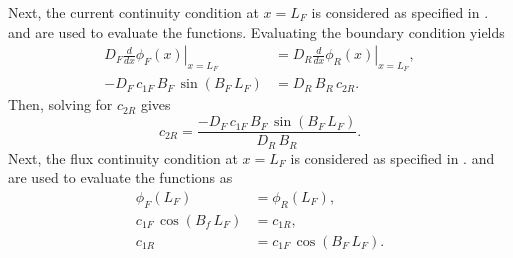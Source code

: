   Next, the current continuity condition at $x=L_F$ is considered as specified
  in .  and
   are used to evaluate the functions.
  Evaluating the boundary condition yields
  \begin{align}
    \left. D_F \frac{d}{dx} \phi_F(x) \right|_{x=L_F} &= 
      \left. D_R \frac{d}{dx} \phi_R(x) \right|_{x=L_F} ,\\
    -D_F \, c_{1F} \, B_F \, \sin(B_F \, L_F) &= D_R \, B_R \, c_{2R}.
  \end{align}
  Then, solving for $c_{2R}$ gives
  \begin{equation}
    \label{eq:2reg_c2r_b}
    c_{2R} = \frac{-D_F \, c_{1F} \, B_F \, \sin(B_F \, L_F)}{D_R\,B_R}.
  \end{equation}
  Next, the flux continuity condition at $x=L_F$ is considered as specified in 
  .  and 
   are used to evaluate the functions as
  \begin{align}
    \phi_F(L_F) &= \phi_R(L_F) ,\\
    c_{1F} \, \cos(B_f \, L_F) &= c_{1R} ,\\
    \label{eq:2reg_c1r}
    c_{1R} &= c_{1F} \, \cos(B_F \, L_F).
  \end{align}

